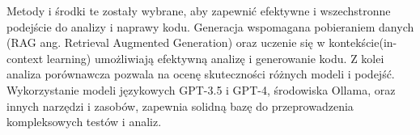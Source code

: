     

Metody i środki te zostały wybrane, aby zapewnić efektywne i wszechstronne podejście do analizy i naprawy kodu. Generacja wspomagana pobieraniem danych (RAG ang. Retrieval Augmented Generation) 
oraz uczenie się w kontekście(in-context learning) umożliwiają efektywną analizę i generowanie kodu. 
Z kolei analiza porównawcza pozwala na ocenę skuteczności różnych modeli i podejść. 
Wykorzystanie modeli językowych GPT-3.5 i GPT-4, środowiska Ollama, oraz innych narzędzi i zasobów, zapewnia solidną bazę do przeprowadzenia kompleksowych testów i analiz.

